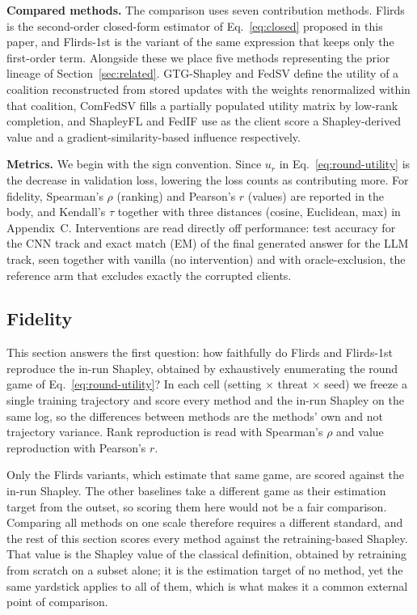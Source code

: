 \documentclass[letterpaper]{article} %
\theoremstyle{definition} %
\begin{document}
\textbf{Compared methods.} The comparison uses seven contribution methods.
Flirds is the second-order closed-form estimator of Eq.~\eqref{eq:closed}
proposed in this paper, and Flirds-1st is the variant of the same expression
that keeps only the first-order term. Alongside these we place five
methods representing the prior lineage of Section~\ref{sec:related}.
GTG-Shapley and FedSV define the utility of a coalition reconstructed from
stored updates with the weights renormalized within that coalition, ComFedSV
fills a partially populated utility matrix by low-rank completion, and
ShapleyFL and FedIF use as the client score a Shapley-derived value and a
gradient-similarity-based influence respectively.

\textbf{Metrics.} We begin with the sign convention. Since $u_r$ in
Eq.~\eqref{eq:round-utility} is the decrease in validation loss, lowering the
loss counts as contributing more. For fidelity, Spearman's $\rho$ (ranking)
and Pearson's $r$ (values) are reported in the body, and Kendall's $\tau$
together with three distances (cosine, Euclidean, max) in Appendix~C.
Interventions are read directly off performance: test accuracy for the CNN
track and exact match (EM) of the final generated answer for the LLM track,
seen together with vanilla (no intervention) and with oracle-exclusion, the
reference arm that excludes exactly the corrupted clients.

\subsection{Fidelity}
\label{sec:fidelity}

This section answers the first question: how faithfully do Flirds and
Flirds-1st reproduce the in-run Shapley, obtained by exhaustively enumerating
the round game of Eq.~\eqref{eq:round-utility}? In each cell (setting
$\times$ threat $\times$ seed) we freeze a single training trajectory and
score every method and the in-run Shapley on the same log, so the differences
between methods are the methods' own and not trajectory variance. Rank
reproduction is read with Spearman's $\rho$ and value reproduction with
Pearson's $r$.

Only the Flirds variants, which estimate that same game, are scored against
the in-run Shapley. The other baselines take a different game as their
estimation target from the outset, so scoring them here would not be a fair
comparison. Comparing all methods on one scale therefore requires a
different standard, and the rest of this section scores every method
against the retraining-based Shapley. That value
is the Shapley value of the classical definition, obtained by retraining from
scratch on a subset alone; it is the estimation target of no method, yet the
same yardstick applies to all of them, which is what makes it a common
external point of comparison.
\end{document}
